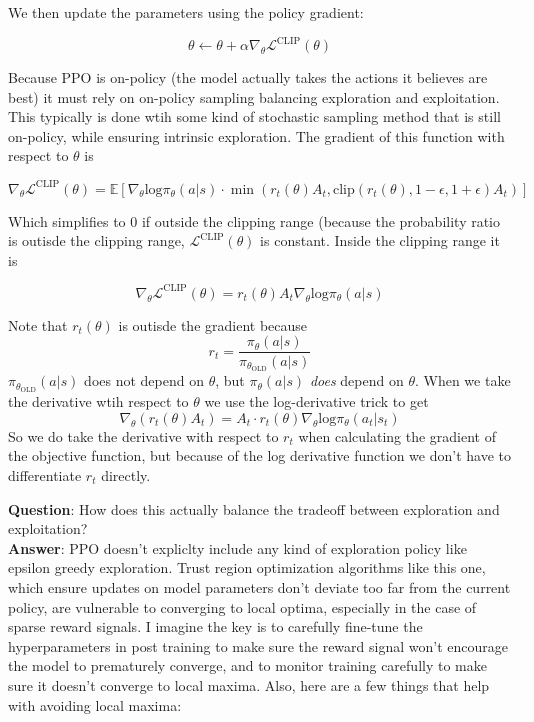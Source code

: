 \documentclass[12pt]{article}
\begin{document}
We then update the parameters using the policy gradient: 

\[\theta \leftarrow \theta + \alpha \nabla_\theta\mathcal{L}^{\text{CLIP}}(\theta)\]

Because PPO is on-policy (the model actually takes the actions it believes are best) it must rely on on-policy sampling balancing exploration and exploitation. This typically is done wtih some kind of stochastic sampling method that is still on-policy, while ensuring intrinsic exploration. The gradient of this function with respect to \(\theta\) is 

\[\nabla_\theta \mathcal{L}^{\text{CLIP}}(\theta) =  \mathbb{E} \left[ \nabla_\theta \text{log}\pi_\theta(a|s) \cdot \min (r_t(\theta)A_t, \text{clip}(r_t(\theta), 1 - \epsilon, 1+\epsilon)A_t)\right]\]

Which simplifies to 0 if outside the clipping range (because the probability ratio is outisde the clipping range, \(\mathcal{L}^{\text{CLIP}}(\theta)\) is constant. Inside the clipping range it is 

\[\nabla_\theta \mathcal{L}^{\text{CLIP}}(\theta) = r_t(\theta)A_t  \nabla_\theta \text{log}\pi_\theta(a|s) \]

Note that \(r_t(\theta)\) is outisde the gradient because 
\[r_t = \frac{\pi_\theta(a|s)}{\pi_{\theta_{\text{OLD}}}(a|s)}\]
\(\pi_{\theta_{\text{OLD}}}(a|s)\) does not depend on \(\theta\), but \(\pi_\theta(a|s)\) \emph{does} depend on \(\theta\). When we take the derivative wtih respect to \(\theta\) we use the log-derivative trick to get 
\[\nabla_\theta(r_t(\theta)A_t) = A_t \cdot r_t(\theta)\nabla_\theta \text{log}\pi_\theta(a_t|s_t)\]
So we do take the derivative with respect to \(r_t\) when calculating the gradient of the objective function, but because of the log derivative function we don't have to differentiate \(r_t\) directly.

\textbf{Question}: How does this actually balance the tradeoff between exploration and exploitation? \\

\textbf{Answer}: PPO doesn't expliclty include any kind of exploration policy like epsilon greedy exploration. Trust region optimization algorithms like this one, which ensure updates on model parameters don't deviate too far from the current policy, are vulnerable to converging to local optima, especially in the case of sparse reward signals. I imagine the key is to carefully fine-tune the hyperparameters in post training to make sure the reward signal won't encourage the model to prematurely converge, and to monitor training carefully to make sure it doesn't converge to local maxima. Also, here are a few things that help with avoiding local maxima:\\
\end{document}
